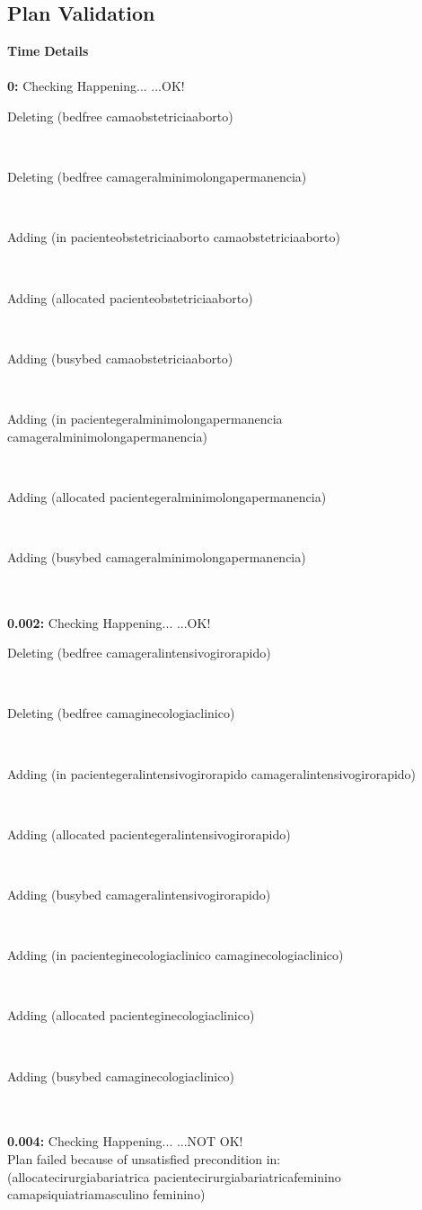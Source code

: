 \documentclass[a4paper,12pt]{article}
\newcommand{\headingtimedetails}{{\bf Time} \qquad \= {\bf Details}\\[0.8ex]}
\newcommand{\atime}[1]{{\bf #1:}}
\newcommand{\action}[1]{{\sf #1}}
\newcommand{\exprn}[1]{{\sf #1}}
\newcommand{\checkhappening}{Checking Happening... }
\newcommand{\listrow}[1]{\begin{minipage}[t]{11.5cm} #1 \end{minipage}}
\newcommand{\happeningOK}{...OK!}
\newcommand{\notOK}{...NOT OK!}
\newcommand{\adding}[1]{\listrow{Adding \exprn{#1} }}
\newcommand{\deleting}[1]{\listrow{Deleting \exprn{#1} }}
\begin{document}
\subsection{Plan Validation}
\begin{tabbing}
\headingtimedetails 
\\
\atime{0} \> \checkhappening\happeningOK\\
 \> \deleting{(bedfree camaobstetriciaaborto)}\\
 \> \deleting{(bedfree camageralminimolongapermanencia)}\\
 \> \adding{(in pacienteobstetriciaaborto camaobstetriciaaborto)}\\
 \> \adding{(allocated pacienteobstetriciaaborto)}\\
 \> \adding{(busybed camaobstetriciaaborto)}\\
 \> \adding{(in pacientegeralminimolongapermanencia camageralminimolongapermanencia)}\\
 \> \adding{(allocated pacientegeralminimolongapermanencia)}\\
 \> \adding{(busybed camageralminimolongapermanencia)}\\
\\
\atime{0.002} \> \checkhappening\happeningOK\\
 \> \deleting{(bedfree camageralintensivogirorapido)}\\
 \> \deleting{(bedfree camaginecologiaclinico)}\\
 \> \adding{(in pacientegeralintensivogirorapido camageralintensivogirorapido)}\\
 \> \adding{(allocated pacientegeralintensivogirorapido)}\\
 \> \adding{(busybed camageralintensivogirorapido)}\\
 \> \adding{(in pacienteginecologiaclinico camaginecologiaclinico)}\\
 \> \adding{(allocated pacienteginecologiaclinico)}\\
 \> \adding{(busybed camaginecologiaclinico)}\\
\\
\atime{0.004} \> \checkhappening \notOK \\
 \> Plan failed because of unsatisfied precondition in:\\
 \> \action{(allocatecirurgiabariatrica pacientecirurgiabariatricafeminino camapsiquiatriamasculino feminino)}\\
\\
\end{tabbing}
\end{document}
